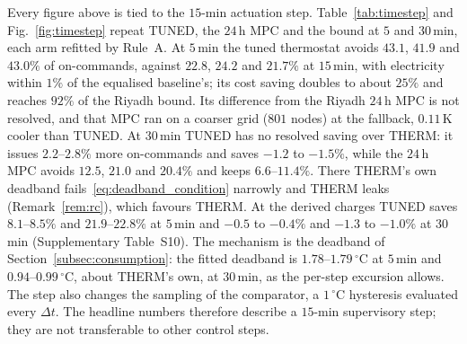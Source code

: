\documentclass[pdflatex,sn-mathphys-num,iicol]{sn-jnl}
\theoremstyle{thmstyleone}\newtheorem{proposition}{Proposition}\newtheorem{corollary}{Corollary}
\theoremstyle{thmstyletwo}\newtheorem{remark}{Remark}\newtheorem{observation}{Observation}
\theoremstyle{thmstylethree}\newtheorem{definition}{Definition}
\begin{document}
Every figure above is tied to the $15$-min actuation step. Table~\ref{tab:timestep} and Fig.~\ref{fig:timestep} repeat TUNED, the $24\,$h MPC and the bound at $5$ and $30\,$min, each arm refitted by Rule~A. At $5\,$min the tuned thermostat avoids $43.1$, $41.9$ and $43.0\%$ of on-commands, against $22.8$, $24.2$ and $21.7\%$ at $15\,$min, with electricity within $1\%$ of the equalised baseline's; its cost saving doubles to about $25\%$ and reaches $92\%$ of the Riyadh bound. Its difference from the Riyadh $24\,$h MPC is not resolved, and that MPC ran on a coarser grid ($801$ nodes) at the fallback, $0.11\,$K cooler than TUNED. At $30\,$min TUNED has no resolved saving over THERM: it issues $2.2$--$2.8\%$ more on-commands and saves $-1.2$ to $-1.5\%$, while the $24\,$h MPC avoids $12.5$, $21.0$ and $20.4\%$ and keeps $6.6$--$11.4\%$. There THERM's own deadband fails~\eqref{eq:deadband_condition} narrowly and THERM leaks (Remark~\ref{rem:rc}), which favours THERM. At the derived charges TUNED saves $8.1$--$8.5\%$ and $21.9$--$22.8\%$ at $5\,$min and $-0.5$ to $-0.4\%$ and $-1.3$ to $-1.0\%$ at $30\,$min (Supplementary Table~S10). The mechanism is the deadband of Section~\ref{subsec:consumption}: the fitted deadband is $1.78$--$1.79\,^\circ$C at $5\,$min and $0.94$--$0.99\,^\circ$C, about THERM's own, at $30\,$min, as the per-step excursion allows. The step also changes the sampling of the comparator, a $1\,^\circ$C hysteresis evaluated every $\Delta t$. The headline numbers therefore describe a $15$-min supervisory step; they are not transferable to other control steps.


\end{document}
